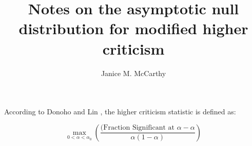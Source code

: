 \documentclass[11pt]{article}
\title{\sc Notes on the asymptotic null distribution for modified higher criticism}
\author{Janice M. McCarthy}
\begin{document}
According to Donoho and Lin \cite{HCHM}, the higher criticism statistic is defined as:

$$\max_{0<\alpha<\alpha_0}\left(
\frac{(\textrm{Fraction Significant at } \alpha - \alpha}{\alpha (1 - \alpha)}\right)$$


\end{document}
